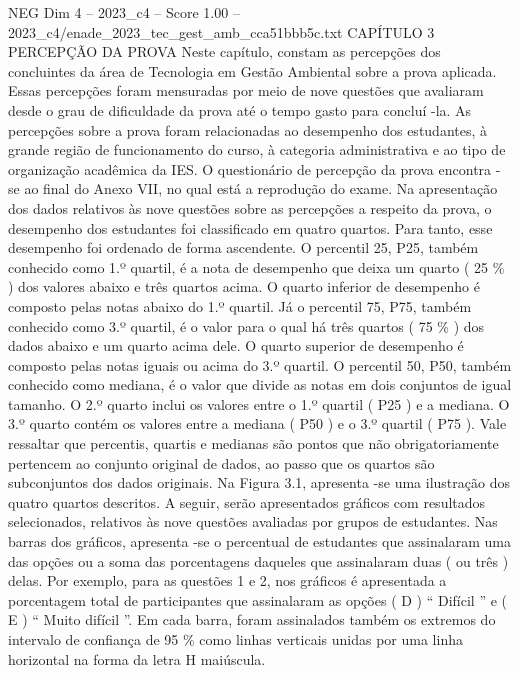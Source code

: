 \begin{textsample}{NEG Dim 4 – 2023\_c4 – Score 1.00 – 2023\_c4/enade\_2023\_tec\_gest\_amb\_cca51bbb5c.txt}  \label{ex:f4_neg_195}
CAPÍTULO 3 PERCEPÇÃO DA PROVA Neste capítulo, constam as percepções dos concluintes da área de Tecnologia em Gestão Ambiental sobre a prova aplicada.
Essas percepções foram mensuradas por meio de nove questões que avaliaram desde o grau de dificuldade da prova até o tempo gasto para concluí -la.
As percepções sobre a prova foram relacionadas ao desempenho dos estudantes, à grande região de funcionamento do curso, à categoria administrativa e ao tipo de organização acadêmica da IES.
O questionário de percepção da prova encontra -se ao final do Anexo VII, no qual está a reprodução do exame.
Na apresentação dos dados relativos às nove questões sobre as percepções a respeito da prova, o desempenho dos estudantes foi classificado em quatro quartos.
Para tanto, esse desempenho foi ordenado de forma ascendente.
O percentil 25, P25, também conhecido como 1.º quartil, é a nota de desempenho que deixa um quarto ( 25 \% ) dos valores abaixo e três quartos acima.
O quarto inferior de desempenho é composto pelas notas abaixo do 1.º quartil.
Já o percentil 75, P75, também conhecido como 3.º quartil, é o valor para o qual há três quartos ( 75 \% ) dos dados abaixo e um quarto acima dele.
O quarto superior de desempenho é composto pelas notas iguais ou acima do 3.º quartil.
O percentil 50, P50, também conhecido como mediana, é o valor que divide as notas em dois conjuntos de igual tamanho.
O 2.º quarto inclui os valores entre o 1.º quartil ( P25 ) e a mediana.
O 3.º quarto contém os valores entre a mediana ( P50 ) e o 3.º quartil ( P75 ).
Vale ressaltar que percentis, quartis e medianas são pontos que não obrigatoriamente pertencem ao conjunto original de dados, ao passo que os quartos são subconjuntos dos dados originais.
Na Figura 3.1, apresenta -se uma ilustração dos quatro quartos descritos.
A seguir, serão apresentados gráficos com resultados selecionados, relativos às nove questões avaliadas por grupos de estudantes.
Nas barras dos gráficos, apresenta -se o percentual de estudantes que assinalaram uma das opções ou a soma das porcentagens daqueles que assinalaram duas ( ou três ) delas.
Por exemplo, para as questões 1 e 2, nos gráficos é apresentada a porcentagem total de participantes que assinalaram as opções ( D ) “ Difícil ” e ( E ) “ Muito difícil ”.
Em cada barra, foram assinalados também os extremos do intervalo de confiança de 95 \% como linhas verticais unidas por uma linha horizontal na forma da letra H maiúscula.

\end{textsample}
